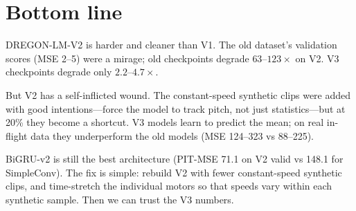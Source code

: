 \documentclass[11pt,a4paper]{article}
\begin{document}
\section{Bottom line}

DREGON-LM-V2 is harder and cleaner than V1. The old dataset's validation
scores (MSE 2--5) were a mirage; old checkpoints degrade $63$--$123\times$
on V2. V3 checkpoints degrade only $2.2$--$4.7\times$.

But V2 has a self-inflicted wound. The constant-speed synthetic clips were
added with good intentions---force the model to track pitch, not just
statistics---but at 20\% they become a shortcut. V3 models learn to predict
the mean; on real in-flight data they underperform the old models (MSE
124--323 vs 88--225).

BiGRU-v2 is still the best architecture (PIT-MSE 71.1 on V2 valid vs 148.1
for SimpleConv). The fix is simple: rebuild V2 with fewer constant-speed
synthetic clips, and time-stretch the individual motors so that speeds vary
within each synthetic sample. Then we can trust the V3 numbers.
\end{document}
